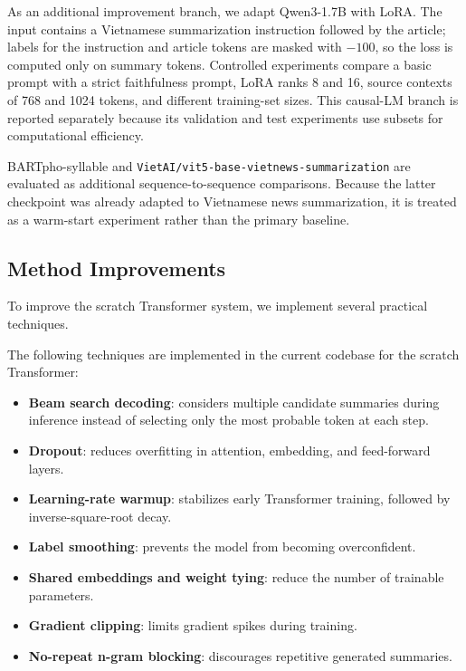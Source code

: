\documentclass[conference]{IEEEtran}
\begin{document}
As an additional improvement branch, we adapt Qwen3-1.7B with LoRA. The input contains a Vietnamese summarization instruction followed by the article; labels for the instruction and article tokens are masked with $-100$, so the loss is computed only on summary tokens. Controlled experiments compare a basic prompt with a strict faithfulness prompt, LoRA ranks 8 and 16, source contexts of 768 and 1024 tokens, and different training-set sizes. This causal-LM branch is reported separately because its validation and test experiments use subsets for computational efficiency.

BARTpho-syllable and \texttt{VietAI/vit5-base-vietnews-summarization} are evaluated as additional sequence-to-sequence comparisons. Because the latter checkpoint was already adapted to Vietnamese news summarization, it is treated as a warm-start experiment rather than the primary baseline.

\subsection{Method Improvements}
To improve the scratch Transformer system, we implement several practical techniques.

The following techniques are implemented in the current codebase for the scratch Transformer:
\begin{itemize}
    \item \textbf{Beam search decoding}: considers multiple candidate summaries during inference instead of selecting only the most probable token at each step.
    \item \textbf{Dropout}: reduces overfitting in attention, embedding, and feed-forward layers.
    \item \textbf{Learning-rate warmup}: stabilizes early Transformer training, followed by inverse-square-root decay.
    \item \textbf{Label smoothing}: prevents the model from becoming overconfident.
    \item \textbf{Shared embeddings and weight tying}: reduce the number of trainable parameters.
    \item \textbf{Gradient clipping}: limits gradient spikes during training.
    \item \textbf{No-repeat n-gram blocking}: discourages repetitive generated summaries.
\end{itemize}
\end{document}
